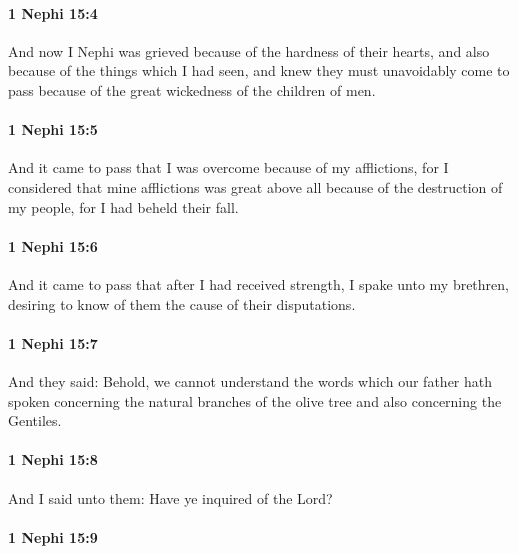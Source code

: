 		\paragraph{1 Nephi 15:4} %
			\label{1NEPHI-15-4}

			And now I Nephi was grieved because of the hardness of their hearts,
			and also because of the things which I had seen,
			and knew they must unavoidably come to pass
			because of the great wickedness of the children of men.

		\paragraph{1 Nephi 15:5} %
			\label{1NEPHI-15-5}

			And it came to pass that I was overcome because of my afflictions,
			for I considered that mine afflictions was great above all
			because of the destruction of my people,
			for I had beheld their fall.

		\paragraph{1 Nephi 15:6} %
			\label{1NEPHI-15-6}

			And it came to pass that after I had received strength,
			I spake unto my brethren,
			desiring to know of them the cause of their disputations.

		\paragraph{1 Nephi 15:7} %
			\label{1NEPHI-15-7}

			And they said:
			Behold, we cannot understand the words which our father hath spoken
			concerning the natural branches of the olive tree
			and also concerning the Gentiles.

		\paragraph{1 Nephi 15:8} %
			\label{1NEPHI-15-8}

			And I said unto them:
			Have ye inquired of the Lord?

		\paragraph{1 Nephi 15:9} %
			\label{1NEPHI-15-9}

